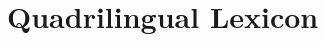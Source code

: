 \documentclass[a4paper,11pt]{article}
\newcommand{\red}[1]{\textcolor{red}{#1}}
\newcommand{\mc}[3]{\multicolumn{#1}{#2}{#3}}
\begin{document}
% 
% 
% 
% 
% 


\section{Quadrilingual Lexicon}
\label{s:lexicon}
\end{document}
